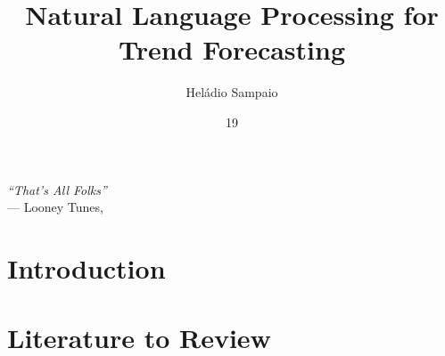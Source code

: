 \documentclass[tg, eng, dv]{ita}    %
\author{Heládio Sampaio}{Lopes}
\title{Natural Language Processing for Trend Forecasting}
\date{19}{JUNE}{2020}
\begin{document}
	
\maketitle

\begin{itadedication}

\end{itadedication}

\begin{itathanks}

\end{itathanks}

\thispagestyle{empty}
\ifhyperref{}\fi
\begin{flushright}
\begin{spacing}{1}
\mbox{}\vfill
{\sffamily\itshape
``That's All Folks''\\}
--- Looney Tunes, \textsc{}
\end{spacing}
\end{flushright}

\begin{abstract}
\noindent

\end{abstract}

\begin{englishabstract}
\noindent

\end{englishabstract}

\listoffigures %

\listoftables %

\listofabbreviations


\tableofcontents

\mainmatter

\chapter{Introduction}\label{chap:intro}


\chapter{Literature to Review}\label{chap:background}

\end{document}
